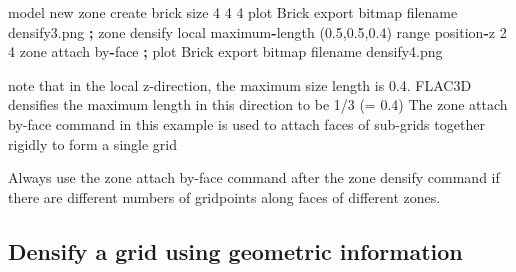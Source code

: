 \documentclass[a4paper, nobind]{templates/ociamthesis}
\newenvironment{Shaded}{\begin{snugshade}}{\end{snugshade}}
\newcommand{\BuiltInTok}[1]{#1}
\newcommand{\DecValTok}[1]{\textcolor[rgb]{0.00,0.00,0.81}{#1}}
\newcommand{\FloatTok}[1]{\textcolor[rgb]{0.00,0.00,0.81}{#1}}
\newcommand{\NormalTok}[1]{#1}
\newcommand{\OperatorTok}[1]{\textcolor[rgb]{0.81,0.36,0.00}{\textbf{#1}}}
\newcommand{\StringTok}[1]{\textcolor[rgb]{0.31,0.60,0.02}{#1}}
\renewenvironment{Shaded}
{
  \vspace{10pt}%
  \begin{snugshade}%
}{%
  \end{snugshade}%
  \vspace{8pt}%
}
\begin{document}
\begin{Shaded}
\begin{Highlighting}[]
\NormalTok{model new}
\NormalTok{zone create brick size }\DecValTok{4} \DecValTok{4} \DecValTok{4}
\NormalTok{plot }\StringTok{\textquotesingle{}Brick\textquotesingle{}}\NormalTok{ export bitmap filename }\StringTok{\textquotesingle{}densify3.png\textquotesingle{}}
\OperatorTok{;}
\NormalTok{zone densify local maximum}\OperatorTok{{-}}\NormalTok{length (}\FloatTok{0.5}\NormalTok{,}\FloatTok{0.5}\NormalTok{,}\FloatTok{0.4}\NormalTok{) }\BuiltInTok{range}\NormalTok{ position}\OperatorTok{{-}}\NormalTok{z }\DecValTok{2} \DecValTok{4}
\NormalTok{zone attach by}\OperatorTok{{-}}\NormalTok{face}
\OperatorTok{;}
\NormalTok{plot }\StringTok{\textquotesingle{}Brick\textquotesingle{}}\NormalTok{ export bitmap filename }\StringTok{\textquotesingle{}densify4.png\textquotesingle{}}
\end{Highlighting}
\end{Shaded}

note that in the local z-direction, the maximum size length is 0.4. FLAC3D densifies the maximum length in this direction to be 1/3 (= 0.4)
The zone attach by-face command in this example is used to attach faces of sub-grids together rigidly to form a single grid

Always use the zone attach by-face command after the zone densify command if there are different numbers of gridpoints along faces of different zones.

\hypertarget{densify-a-grid-using-geometric-information}{%
\subsection{Densify a grid using geometric information}\label{densify-a-grid-using-geometric-information}}
\end{document}
